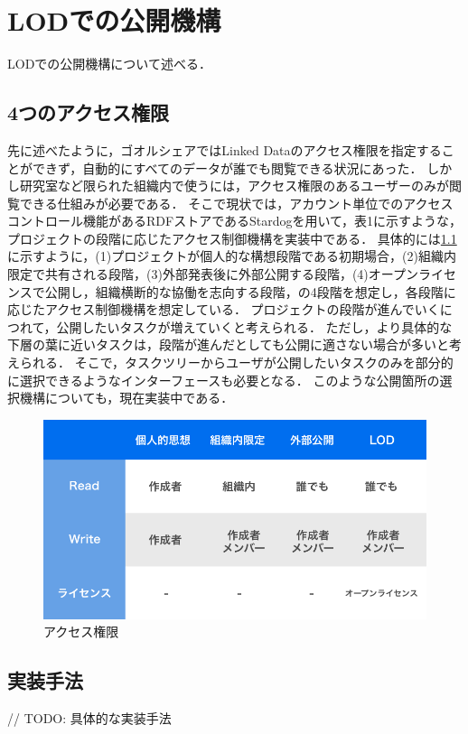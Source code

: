 \chapter{LODでの公開機構}
LODでの公開機構について述べる．

\section{4つのアクセス権限}
先に述べたように，ゴオルシェアではLinked Dataのアクセス権限を指定することができず，自動的にすべてのデータが誰でも閲覧できる状況にあった．
しかし研究室など限られた組織内で使うには，アクセス権限のあるユーザーのみが閲覧できる仕組みが必要である．
そこで現状では，アカウント単位でのアクセスコントロール機能があるRDFストアであるStardogを用いて，表1に示すような，プロジェクトの段階に応じたアクセス制御機構を実装中である．
具体的には\ref{img:permission_table}に示すように，(1)プロジェクトが個人的な構想段階である初期場合，(2)組織内限定で共有される段階，(3)外部発表後に外部公開する段階，(4)オープンライセンスで公開し，組織横断的な協働を志向する段階，の4段階を想定し，各段階に応じたアクセス制御機構を想定している．
プロジェクトの段階が進んでいくにつれて，公開したいタスクが増えていくと考えられる．
ただし，より具体的な下層の葉に近いタスクは，段階が進んだとしても公開に適さない場合が多いと考えられる．
そこで，タスクツリーからユーザが公開したいタスクのみを部分的に選択できるようなインターフェースも必要となる．
このような公開箇所の選択機構についても，現在実装中である．

\begin{figure}[t]
	\begin{center}
		\includegraphics[width=0.9\linewidth]{assets/img/permission_table.png}
		\caption{アクセス権限}
		\label{img:permission_table}
	\end{center}
\end{figure}

\section{実装手法}
// TODO: 具体的な実装手法
